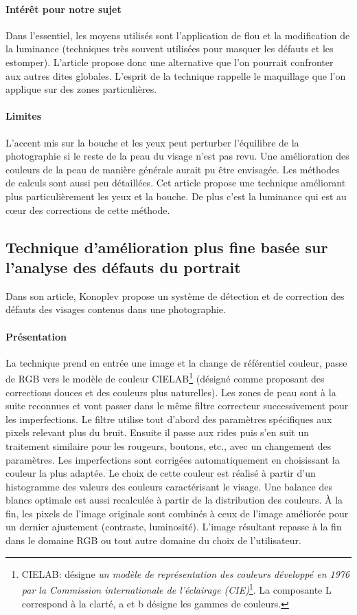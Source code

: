 \documentclass[11pt, french]{report-rd-info}
\begin{document}
\paragraph{Intérêt pour notre sujet}
Dans l’essentiel, les moyens utilisés sont l’application de flou et la modification de la luminance (techniques très souvent utilisées pour masquer les défauts et les estomper). L’article propose donc une alternative que l’on pourrait confronter aux autres dites globales. L’esprit de la technique rappelle le maquillage que l’on applique sur des zones particulières.
\paragraph{Limites}
L’accent mis sur la bouche et les yeux peut perturber l’équilibre de la photographie si le reste de la peau du visage n’est pas revu. Une amélioration des couleurs de la peau de manière générale aurait pu être envisagée. Les méthodes de calculs sont aussi peu détaillées.
Cet article propose une technique améliorant plus particulièrement les yeux et la bouche. De plus c’est la luminance qui est au cœur des corrections de cette méthode.
\subsection{Technique d’amélioration plus fine basée sur l’analyse des défauts du portrait}
Dans son article, Konoplev \cite{Konoplev2012} propose un système de détection et de correction des défauts des visages contenus dans une photographie.
\paragraph{Présentation}
La technique prend en entrée une image et la change de référentiel couleur, passe de RGB vers le modèle de couleur CIELAB\footnote{CIELAB: désigne \textit{un modèle de représentation des couleurs développé en 1976 par la Commission internationale de l'éclairage (CIE)}\footnote{Wikipédia, CIELab,http://fr.wikipedia.org/wiki/CIE\_Lab}. La composante L correspond à la clarté, a et b désigne les gammes de couleurs.} (désigné comme proposant des corrections douces et des couleurs plus naturelles). Les zones de peau sont à la suite reconnues et vont passer dans le même filtre correcteur successivement pour les imperfections. Le filtre utilise tout d'abord des paramètres spécifiques aux pixels relevant plus du bruit. Ensuite il passe aux rides puis s'en suit un traitement similaire pour les rougeurs, boutons, etc., avec un changement des paramètres. Les imperfections sont corrigées automatiquement en choisissant la couleur la plus adaptée. Le choix de cette couleur est réalisé à partir d’un histogramme des valeurs des couleurs caractérisant le visage. Une balance des blancs optimale est aussi recalculée à partir de la distribution des couleurs. À la fin, les pixels de l’image originale sont combinés à ceux de l’image améliorée pour un dernier ajustement (contraste, luminosité). L'image résultant repasse à la fin dans le domaine RGB ou tout autre domaine du choix de l’utilisateur.
\end{document}
